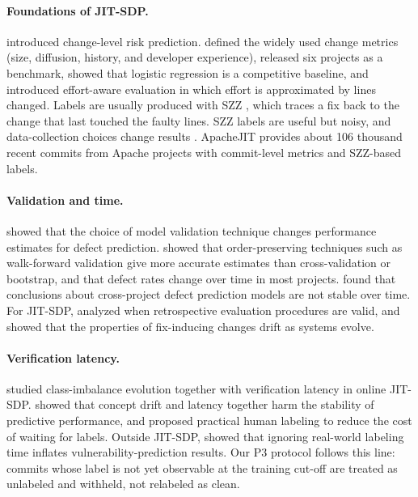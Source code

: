 \documentclass[11pt,a4paper]{article}
\begin{document}
\paragraph{Foundations of JIT-SDP.}
\citet{mockus2000} introduced change-level risk prediction. \citet{kamei2013} defined the widely used change metrics (size, diffusion, history, and developer experience), released six projects as a benchmark, showed that logistic regression is a competitive baseline, and introduced effort-aware evaluation in which effort is approximated by lines changed. Labels are usually produced with SZZ \citep{sliwerski2005}, which traces a fix back to the change that last touched the faulty lines. SZZ labels are useful but noisy, and data-collection choices change results \citep{herbold2022}. ApacheJIT \citep{keshavarz2022} provides about 106 thousand recent commits from Apache projects with commit-level metrics and SZZ-based labels.

\paragraph{Validation and time.}
\citet{tantithamthavorn2017} showed that the choice of model validation technique changes performance estimates for defect prediction. \citet{falessi2020} showed that order-preserving techniques such as walk-forward validation give more accurate estimates than cross-validation or bootstrap, and that defect rates change over time in most projects. \citet{bangash2020} found that conclusions about cross-project defect prediction models are not stable over time. For JIT-SDP, \citet{song2023a} analyzed when retrospective evaluation procedures are valid, and \citet{mcintosh2018} showed that the properties of fix-inducing changes drift as systems evolve.

\paragraph{Verification latency.}
\citet{cabral2019} studied class-imbalance evolution together with verification latency in online JIT-SDP. \citet{cabral2022} showed that concept drift and latency together harm the stability of predictive performance, and \citet{song2023b} proposed practical human labeling to reduce the cost of waiting for labels. Outside JIT-SDP, \citet{jimenez2019} showed that ignoring real-world labeling time inflates vulnerability-prediction results. Our P3 protocol follows this line: commits whose label is not yet observable at the training cut-off are treated as unlabeled and withheld, not relabeled as clean.
\end{document}

